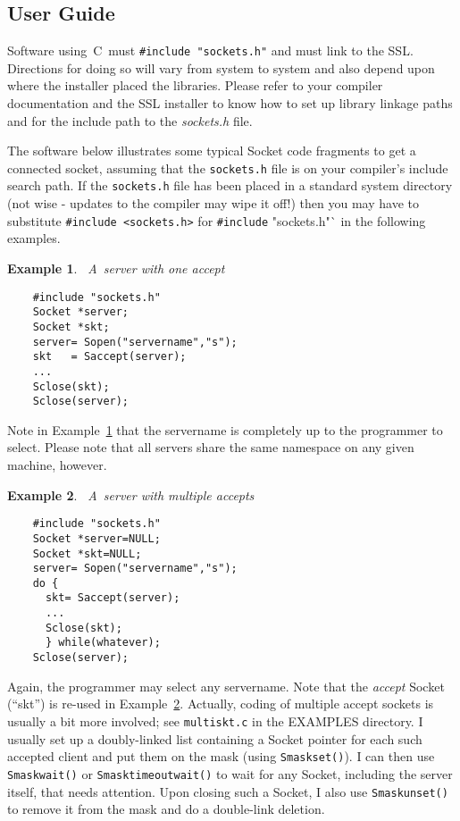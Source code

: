 \documentclass[12pt]{article}
\def\SSL{{\small SSL}}
\newtheorem{example}{Example}[section]
\begin{document}
\subsection{User Guide}

Software using~C~must \verb`#include "sockets.h"` and must link to the \SSL.
Directions for doing so will vary from system to system and also depend upon
where the installer placed the libraries.  Please refer to your compiler
documentation and the {\SSL} installer to know how to set up library linkage
paths and for the include path to the {\em sockets.h} file.

The software below illustrates some typical Socket code fragments to get a
connected socket, assuming that the \verb`sockets.h` file is on your compiler's
include search path.  If the \verb`sockets.h` file has been placed in a
standard system directory (not wise - updates to the compiler may wipe it off!)
then you may have to substitute \verb`#include <sockets.h>` for \verb`#include` 
"sockets.h"` in the following examples.

\begin{example}~A~server with one accept     \\ \label{one-accept}
 \begin{verbatim}
    #include "sockets.h"
    Socket *server;
    Socket *skt;
    server= Sopen("servername","s");
    skt   = Saccept(server);
    ...
    Sclose(skt);
    Sclose(server);
 \end{verbatim}
\end{example}

Note in Example~\ref{one-accept} that the servername is completely up to the
programmer to select.  Please note that all servers share the same namespace on
any given machine, however.

\begin{example}~A~server with multiple accepts \\ \label{multi-accept}
 \begin{verbatim}
    #include "sockets.h"
    Socket *server=NULL;
    Socket *skt=NULL;
    server= Sopen("servername","s");
    do {
      skt= Saccept(server);
      ...
      Sclose(skt);
      } while(whatever);
    Sclose(server);
 \end{verbatim}
\end{example}

Again, the programmer may select any servername.  Note that the {\em accept}
Socket (``skt'') is re-used in Example~\ref{multi-accept}.  Actually, coding
of multiple accept sockets is usually a bit more involved; see  \verb`multiskt.c`
in the {\small EXAMPLES} directory.  I usually set up a doubly-linked list
containing a Socket pointer for each such accepted client and put them
on the mask (using \verb`Smaskset()`).  I can then use \verb`Smaskwait()` or
\verb`Smasktimeoutwait()` to wait for any Socket, including the server itself,
that needs attention.  Upon closing such a Socket, I also use  \verb`Smaskunset()`
to remove it from the mask and do a double-link deletion.
\end{document}
